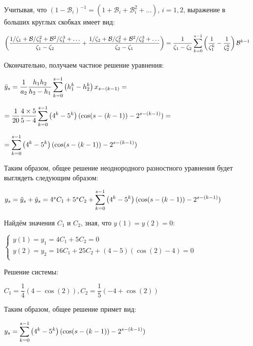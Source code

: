 \documentclass[14pt,fleqn]{extarticle}
\begin{document}
	Учитывая, что $(1-\mathcal{B}_i)^{-1} = (1+\mathcal{B}_i+\mathcal{B}_i^2+\dots)$, $i=1,2$, выражение в больших круглых скобках имеет вид:
	\begin{center}
		$\left(\dfrac{1/\zeta_1 + \mathcal{B}/\zeta_1^2 + \mathcal{B}^2/\zeta_1^3 + \dots}{\zeta_1 - \zeta_2} + \dfrac{1/\zeta_2 + \mathcal{B}/\zeta_2^2 + \mathcal{B}^2/\zeta_2^3 + \dots}{\zeta_2 - \zeta_1}\right) = \dfrac{1}{\zeta_1-\zeta_2} \smashoperator[r]{\sum_{k=0}^{s-1}}\left(\dfrac{1}{\zeta_1^k} - \dfrac{1}{\zeta_2^k}\right)\mathcal{B}^{k-1}$
	\end{center}
	\newpage
	Окончательно, получаем частное решение уравнения:
	\begin{center}
		$\breve{y}_s = \dfrac{1}{a_2} \dfrac{h_1 h_2}{h_2-h_1}\smashoperator[r]{\sum_{k=0}^{s-1}}\left(h_1^k-h_2^k\right)x_{s-(k-1)} = $
	\end{center}
	\begin{center}
		$ = \dfrac{1}{20} \dfrac{4 \times 5}{5-4}\smashoperator[r]{\sum_{k=0}^{s-1}}\left(4^k-5^k\right)(\cos(s-(k-1))-2^{s-(k-1)}) = $
	\end{center}
	\begin{center}
		$ = \smashoperator[r]{\sum_{k=0}^{s-1}}\left(4^k-5^k\right)(\cos(s-(k-1))-2^{s-(k-1)})$
	\end{center}
	Таким образом, общее решение неоднородного разностного уравнения будет выглядеть следующим образом:
	\begin{center}
		$y_s = \hat{y}_s + \breve{y}_s = 4^sC_1 + 5^sC_2 + \smashoperator[r]{\sum_{k=0}^{s-1}}\left(4^k-5^k\right)(\cos(s-(k-1))-2^{s-(k-1)})$
	\end{center}
	Найдём значения $C_1$ и $C_2$, зная, что $y(1) = y(2) = 0$:
	\begin{center}
		$\begin{cases}
			y(1) = y_1 = 4C_1 + 5C_2 = 0 \\
			y(2) = y_2 = 16C_1 + 25C_2 + (4-5)(\cos(2) - 4) = 0\\
		\end{cases}$
	\end{center}
	Решение системы:
	\begin{center}
		$C_1 = \dfrac{1}{4}(4-\cos(2)), C_2 = \dfrac{1}{5}(-4+\cos(2))$
	\end{center}
	Таким образом, общее решение примет вид:
	\begin{center}
		$y_s = \smashoperator[r]{\sum_{k=0}^{s-1}}\left(4^k-5^k\right)(\cos(s-(k-1))-2^{s-(k-1)})$
	\end{center}
	\newpage
\end{document}
